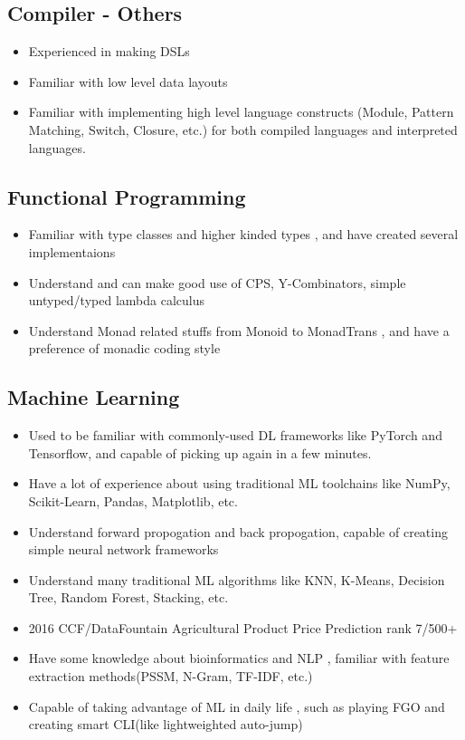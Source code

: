 \documentclass{resume}
\begin{document}
\subsection{\textbf{Compiler - Others}}
\begin{itemize}
  \item Experienced in making DSLs
  \item Familiar with low level data layouts
  \item Familiar with implementing high level language constructs
        (Module, Pattern Matching, Switch, Closure, etc.) for both
        compiled languages and interpreted languages.
\end{itemize}

\subsection{\textbf{Functional Programming}}
\begin{itemize}
  \item Familiar with type classes and higher kinded types
        , and have created several implementaions
  \item Understand and can make good use of CPS, Y-Combinators, simple untyped/typed lambda calculus
  \item Understand Monad related stuffs from Monoid to MonadTrans
        , and have a preference of monadic coding style
\end{itemize}

\subsection{\textbf{Machine Learning}}
\begin{itemize}
  \item Used to be familiar with commonly-used DL frameworks like PyTorch and Tensorflow, and capable of picking up again in a few minutes.
  \item Have a lot of experience about using traditional ML toolchains like NumPy, Scikit-Learn, Pandas, Matplotlib, etc.
  \item Understand forward propogation and back propogation, capable of creating simple neural network frameworks
  \item Understand many traditional ML algorithms like KNN, K-Means, Decision Tree, Random Forest, Stacking, etc.
  \item 2016 CCF/DataFountain Agricultural Product Price Prediction rank 7/500+
  \item Have some knowledge about bioinformatics and NLP
        , familiar with feature extraction methods(PSSM, N-Gram, TF-IDF, etc.)
  \item Capable of taking advantage of ML in daily life
        , such as playing FGO and creating smart CLI(like lightweighted auto-jump)
\end{itemize}
\end{document}
